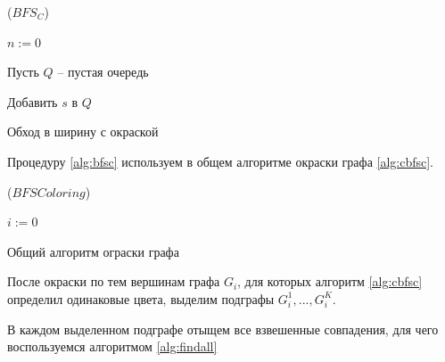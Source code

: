 \begin{algorithm}[H]
	\Large
	\Begin($BFS_C$){
		$n := 0$
		
		Пусть $Q$ -- пустая очередь
		
		Добавить $s$ в $Q$
		
		
	}
	
	\caption{Обход в ширину с окраской}
	\label{alg:bfsc}
\end{algorithm}

Процедуру \ref{alg:bfsc} используем в общем алгоритме окраски графа \ref{alg:cbfsc}.

\begin{algorithm}[H]
	\Large
	\Begin($BFS Coloring$){
		
		
		$i := 0$
		
		
	}
	
	\caption{Общий алгоритм ограски графа}
	\label{alg:cbfsc}
\end{algorithm}

После окраски по тем вершинам графа $G_i$, для которых алгоритм \ref{alg:cbfsc} определил одинаковые цвета, выделим подграфы $G_i^1, ..., G_i^K$.

В каждом выделенном подграфе отыщем все взвешенные совпадения, для чего воспользуемся алгоритмом \ref{alg:findall}

